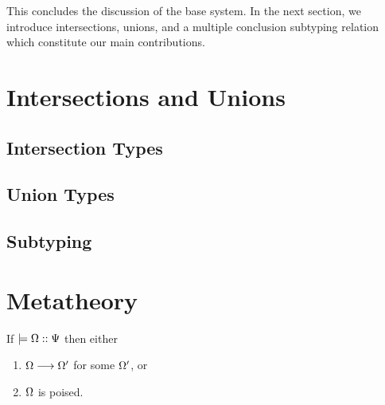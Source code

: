 \documentclass[a4paper,USenglish]{lipics-v2016}
\begin{document}

This concludes the discussion of the base system. In the next section, we introduce intersections, unions, and a multiple conclusion subtyping relation which constitute our main contributions.


\section{Intersections and Unions}
\label{refinements}

  \subsection{Intersection Types}

  \subsection{Union Types}

  \subsection{Subtyping}


\section{Metatheory}
\label{metatheory}

\begin{theorem}[Progress]
If $\models {\Omega} :: {\Psi}$ then either
\begin{enumerate}
  \item $\Omega \longrightarrow \Omega'$ for some $\Omega'$, or
  \item $\Omega$ is poised.
\end{enumerate}
\end{theorem}
\end{document}
